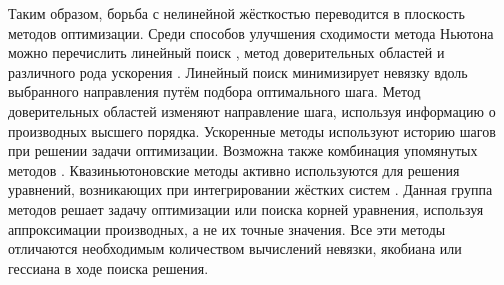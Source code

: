 Таким образом, борьба с нелинейной жёсткостью переводится в плоскость методов оптимизации.
Среди способов улучшения сходимости метода Ньютона можно перечислить линейный поиск \cite{armijo1966minimization, wolfe1969convergence},
метод доверительных областей \cite{sorensen1982newton} и различного рода ускорения \cite{anderson1965iterative, nesterov27method, brown1994convergence}.
Линейный поиск минимизирует невязку вдоль выбранного направления путём подбора оптимального шага.
Метод доверительных областей изменяют направление шага, используя информацию о производных высшего порядка.
Ускоренные методы используют историю шагов при решении задачи оптимизации.
Возможна также комбинация упомянутых методов \cite{brune2015composing}.
Квазиньютоновские методы активно используются для решения уравнений, возникающих при интегрировании жёстких систем
\cite{brown1985experiments, alexander1991modified, moore1994stepsize, schlenkrich2006application}.
Данная группа методов решает задачу оптимизации или поиска корней уравнения, используя аппроксимации производных, а не их точные значения.
Все эти методы отличаются необходимым количеством вычислений невязки, якобиана или гессиана в ходе поиска решения.
